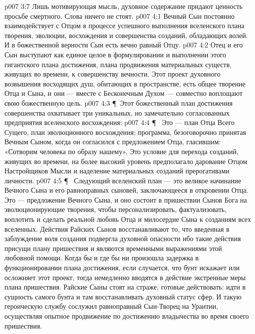 \vs p007 3:7 Лишь мотивирующая мысль, духовное содержание придают ценность просьбе смертного. Слова ничего не стоят.
\vs p007 4:1 Вечный Сын постоянно взаимодействует с Отцом в процессе успешного выполнения  вселенского плана творения, эволюции, восхождения и совершенства созданий, обладающих волей. И в божественной верности Сын есть вечно равный Отцу.
\vs p007 4:2 Отец и его Сын выступают как единое целое в формулировании и выполнении этого гигантского плана достижения, плана продвижения материальных существ, живущих во времени, к совершенству вечности. Этот проект духовного возвышения восходящих душ, обитающих в пространстве, есть общее творение Отца и Сына, и они --- вместе с Бесконечным Духом --- совместно воплощают свою божественную цель.
\vs p007 4:3 \P\ Этот божественный план достижения совершенства охватывает три уникальных, но замечательно согласованных предприятия вселенского восхождения:
\vs p007 4:4 \P\ \bibnobreakspace {} Это --- план Отца Всего Сущего, план эволюционного восхождения; программа, безоговорочно принятая Вечным Сыном, когда он согласился с предложением Отца, гласившим: «Сотворим человека по образу нашему». Это условие для перехода созданий, живущих во времени, на более высокий уровень предполагало дарование Отцом Настройщиков Мысли и наделение материальных созданий прерогативами личности.
\vs p007 4:5 \P\ \bibnobreakspace {} Следующий вселенский план --- это великое начинание Вечного Сына и его равноправных сыновей, заключающееся в откровении Отца. Это --- предложение Вечного Сына, и оно состоит в пришествии Сынов Бога на эволюционирующие творения, чтобы персонализировать, фактуализовать, воплотить и сделать реальной любовь Отца и милосердие Сына к созданиям всех вселенных. Действия Райских Сынов восстанавливают то, что введенная в заблуждение воля создания подвергла духовной опасности ибо такие действия присущи плану пришествия и являются временными выражениями этой любовной помощи. Когда бы и где бы ни произошла задержка в функционировании плана достижения, если случается, что бунт искажает или осложняет этот проект, тогда немедленно вводятся в действие экстренные меры плана пришествия. Райские Сыны стоят на страже, готовые действовать: идти в сущность самого бунта и там восстанавливать духовный статус сфер. И такую героическую службу сослужил равноправный Сын\hyp{}Творец на Урантии, осуществляя опытное продвижение по достижению владычества во время своего пришествия.
